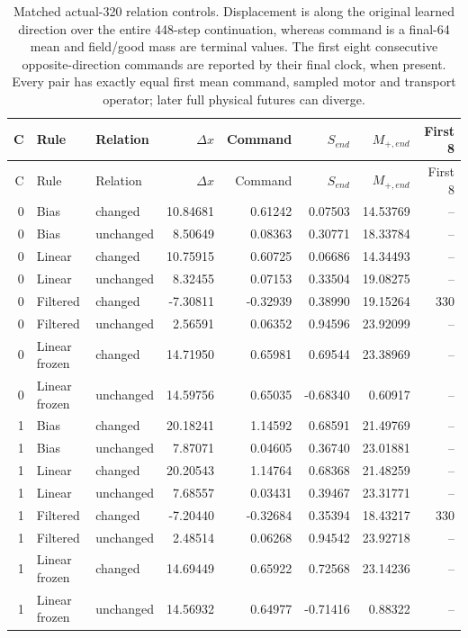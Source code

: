 \begin{longtable}{rllrrrrr}
\caption{Matched actual-320 relation controls. Displacement is along the original learned direction over the entire 448-step continuation, whereas command is a final-64 mean and field/good mass are terminal values. The first eight consecutive opposite-direction commands are reported by their final clock, when present. Every pair has exactly equal first mean command, sampled motor and transport operator; later full physical futures can diverge.}\label{tab:gain-relation}\\
\toprule
C & Rule & Relation & $\Delta x$ & Command & $S_{end}$ & $M_{+,end}$ & First 8 \\
\midrule
\endfirsthead
\toprule
C & Rule & Relation & $\Delta x$ & Command & $S_{end}$ & $M_{+,end}$ & First 8 \\
\midrule
\endhead
0 & Bias & changed & 10.84681 & 0.61242 & 0.07503 & 14.53769 & -- \\
0 & Bias & unchanged & 8.50649 & 0.08363 & 0.30771 & 18.33784 & -- \\
0 & Linear & changed & 10.75915 & 0.60725 & 0.06686 & 14.34493 & -- \\
0 & Linear & unchanged & 8.32455 & 0.07153 & 0.33504 & 19.08275 & -- \\
0 & Filtered & changed & -7.30811 & -0.32939 & 0.38990 & 19.15264 & 330 \\
0 & Filtered & unchanged & 2.56591 & 0.06352 & 0.94596 & 23.92099 & -- \\
0 & Linear frozen & changed & 14.71950 & 0.65981 & 0.69544 & 23.38969 & -- \\
0 & Linear frozen & unchanged & 14.59756 & 0.65035 & -0.68340 & 0.60917 & -- \\
1 & Bias & changed & 20.18241 & 1.14592 & 0.68591 & 21.49769 & -- \\
1 & Bias & unchanged & 7.87071 & 0.04605 & 0.36740 & 23.01881 & -- \\
1 & Linear & changed & 20.20543 & 1.14764 & 0.68368 & 21.48259 & -- \\
1 & Linear & unchanged & 7.68557 & 0.03431 & 0.39467 & 23.31771 & -- \\
1 & Filtered & changed & -7.20440 & -0.32684 & 0.35394 & 18.43217 & 330 \\
1 & Filtered & unchanged & 2.48514 & 0.06268 & 0.94542 & 23.92718 & -- \\
1 & Linear frozen & changed & 14.69449 & 0.65922 & 0.72568 & 23.14236 & -- \\
1 & Linear frozen & unchanged & 14.56932 & 0.64977 & -0.71416 & 0.88322 & -- \\
\bottomrule
\end{longtable}

